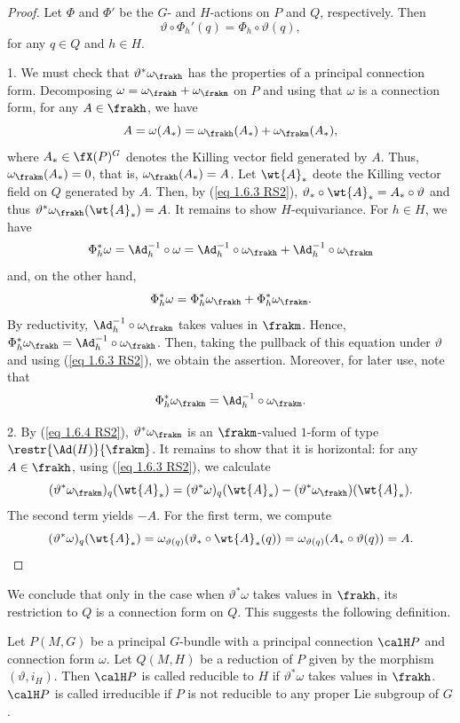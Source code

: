 \begin{proof}
    Let $\Phi$ and $\Phi'$ be the $G$- and $H$-actions on $P$ and $Q$, respectively. Then
    \[\vartheta\circ\Phi_h'(q)=\Phi_h\circ \vartheta(q),\label{eq 1.6.3 RS2}\]
    for any $q\in Q$ and $h\in H$.
    
    1. We must check that $\vartheta^\ast\omega_\frakh$ has the properties of a principal connection form. Decomposing $\omega=\omega_\frakh+\omega_\frakm$ on $P$ and using that $\omega$ is a connection form, for any $A\in\frakh$, we have
    \[A=\omega(A_\ast)=\omega_\frakh(A_\ast)+\omega_\frakm(A_\ast),\]
    where $A_\ast\in \fX(P)^G$ denotes the Killing vector field generated by $A$. Thus, $\omega_\frakm(A_\ast)=0$, that is, $\omega_\frakh(A_\ast)=A$. Let $\wt{A}_\ast$ deote the Killing vector field on $Q$ generated by $A$. Then, by (\ref{eq 1.6.3 RS2}), $\vartheta_\ast\circ \wt{A}_\ast=A_\ast\circ\vartheta$ and thus $\vartheta^\ast\omega_\frakh(\wt{A}_\ast)=A$. It remains to show $H$-equivariance. For $h\in H$, we have
    \[\Phi_h^\ast\omega=\Ad_h^{-1}\circ \omega=\Ad_h^{-1}\circ \omega_\frakh+\Ad_h^{-1}\circ\omega_\frakm\]
    and, on the other hand,
    \[\Phi^\ast_h\omega=\Phi^\ast_h\omega_\frakh+\Phi^\ast_h\omega_\frakm.\]
    By reductivity, $\Ad_h^{-1}\circ\omega_\frakm$ takes values in $\frakm$. Hence, $\Phi^\ast_h\omega_\frakh=\Ad_h^{-1}\circ\omega_\frakh$. Then, taking the pullback of this equation under $\vartheta$ and using (\ref{eq 1.6.3 RS2}), we obtain the assertion. Moreover, for later use, note that
    \[\Phi_h^\ast\omega_\frakm=\Ad_h^{-1}\circ\omega_\frakm.\label{eq 1.6.4 RS2}\]

    2. By (\ref{eq 1.6.4 RS2}), $\vartheta^\ast\omega_\frakm$ is an $\frakm$-valued $1$-form of type $\restr{\Ad(H)}{\frakm}$. It remains to show that it is horizontal: for any $A\in\frakh$, using (\ref{eq 1.6.3 RS2}), we calculate
    \[(\vartheta^\ast\omega_\frakm)_q(\wt{A}_\ast)=(\vartheta^\ast\omega)_q(\wt{A}_\ast)-(\vartheta^\ast\omega_\frakh)(\wt{A}_\ast).\]
    The second term yields $-A$. For the first term, we compute
    \[(\vartheta^\ast\omega)_q(\wt{A}_\ast)=\omega_{\vartheta(q)}(\vartheta_\ast\circ \wt{A}_\ast(q))=\omega_{\vartheta(q)}(A_\ast\circ \vartheta(q))=A.\]
\end{proof}


We conclude that only in the case when $\vartheta^\ast\omega$ takes values in $\frakh$, its restriction to $Q$ is a connection form on $Q$. This suggests the following definition.

\begin{defn}
    Let $P(M,G)$ be a principal $G$-bundle with a principal connection $\calH P$ and connection form $\omega$. Let $Q(M,H)$ be a reduction of $P$ given by the morphism $(\vartheta,i_H)$. Then $\calH P$ is called reducible to $H$ if $\vartheta^\ast\omega$ takes values in $\frakh$. $\calH P$ is called irreducible if $P$ is not reducible to any proper Lie subgroup of $G$.
\end{defn}









